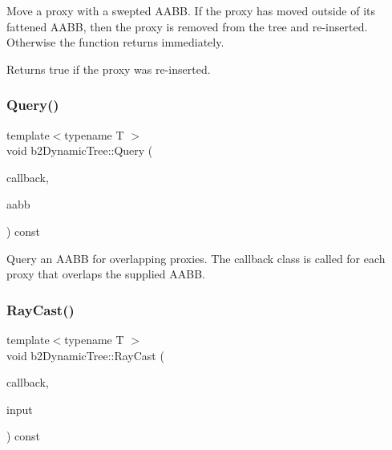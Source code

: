 Move a proxy with a swepted A\+A\+BB. If the proxy has moved outside of its fattened A\+A\+BB, then the proxy is removed from the tree and re-\/inserted. Otherwise the function returns immediately. \begin{DoxyReturn}{Returns}
true if the proxy was re-\/inserted. 
\end{DoxyReturn}
\mbox{\label{classb2_dynamic_tree_a324df3eb65dfc22d3dcdca387737b193}} 
\subsubsection{\texorpdfstring{Query()}{Query()}}
{\footnotesize\ttfamily template$<$typename T $>$ \\
void b2\+Dynamic\+Tree\+::\+Query (\begin{DoxyParamCaption}\item[{T $\ast$}]{callback,  }\item[{const \mbox{\hyperlink{structb2_a_a_b_b}{b2\+A\+A\+BB}} \&}]{aabb }\end{DoxyParamCaption}) const\hspace{0.3cm}{\ttfamily [inline]}}

Query an A\+A\+BB for overlapping proxies. The callback class is called for each proxy that overlaps the supplied A\+A\+BB. \mbox{\label{classb2_dynamic_tree_aebd2dc6ee462e0cd0763a5f472243a13}} 
\subsubsection{\texorpdfstring{RayCast()}{RayCast()}}
{\footnotesize\ttfamily template$<$typename T $>$ \\
void b2\+Dynamic\+Tree\+::\+Ray\+Cast (\begin{DoxyParamCaption}\item[{T $\ast$}]{callback,  }\item[{const \mbox{\hyperlink{structb2_ray_cast_input}{b2\+Ray\+Cast\+Input}} \&}]{input }\end{DoxyParamCaption}) const\hspace{0.3cm}{\ttfamily [inline]}}

